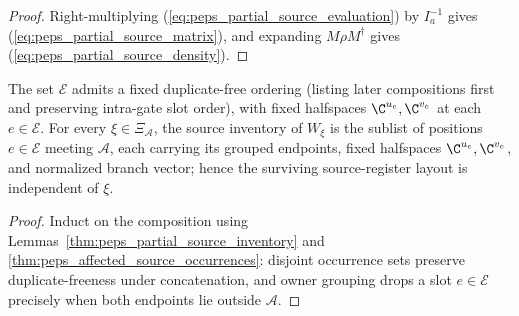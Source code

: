 \begin{proof}
    \leanok
    Right-multiplying (\ref{eq:peps_partial_source_evaluation}) by $I_a^{-1}$
    gives (\ref{eq:peps_partial_source_matrix}), and expanding $M\rho M^\dagger$
    gives (\ref{eq:peps_partial_source_density}).
\end{proof}

\begin{lemma}
    \label{thm:peps_partial_source_order}
    \leanok
    The set $\mathcal E$ admits a fixed duplicate-free ordering (listing later
    compositions first and preserving intra-gate slot order), with fixed
    halfspaces $\C^{u_e},\C^{v_e}$ at each $e\in\mathcal E$. For every
    $\xi\in\Xi_{\mathcal A}$, the source inventory of $W_\xi$ is the sublist of
    positions $e\in\mathcal E$ meeting $\mathcal A$, each carrying its grouped
    endpoints, fixed halfspaces $\C^{u_e},\C^{v_e}$, and normalized branch
    vector; hence the surviving source-register layout is independent of $\xi$.
\end{lemma}

\begin{proof}
    \leanok
    Induct on the composition using Lemmas~\ref{thm:peps_partial_source_inventory}
    and \ref{thm:peps_affected_source_occurrences}: disjoint occurrence sets
    preserve duplicate-freeness under concatenation, and owner grouping drops a
    slot $e\in\mathcal E$ precisely when both endpoints lie outside $\mathcal A$.
\end{proof}
